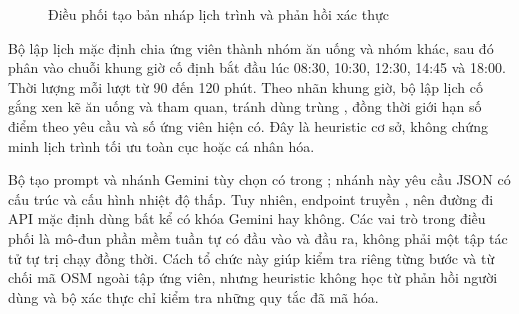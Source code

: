 \begin{figure}[htbp]
    \centering
    \caption{Điều phối tạo bản nháp lịch trình và phản hồi xác thực}
    \label{fig:itinerary_draft_pipeline}
\end{figure}

Bộ lập lịch mặc định chia ứng viên thành nhóm ăn uống và nhóm khác, sau đó phân vào chuỗi khung giờ cố định bắt đầu lúc 08:30, 10:30, 12:30, 14:45 và 18:00. Thời lượng mỗi lượt từ 90 đến 120 phút. Theo nhãn khung giờ, bộ lập lịch cố gắng xen kẽ ăn uống và tham quan, tránh dùng trùng , đồng thời giới hạn số điểm theo yêu cầu và số ứng viên hiện có. Đây là heuristic cơ sở, không chứng minh lịch trình tối ưu toàn cục hoặc cá nhân hóa.

Bộ tạo prompt và nhánh Gemini tùy chọn có trong ; nhánh này yêu cầu JSON có cấu trúc và cấu hình nhiệt độ thấp. Tuy nhiên, endpoint truyền , nên đường đi API mặc định dùng  bất kể có khóa Gemini hay không. Các vai trò trong điều phối là mô-đun phần mềm tuần tự có đầu vào và đầu ra, không phải một tập tác tử tự trị chạy đồng thời. Cách tổ chức này giúp kiểm tra riêng từng bước và từ chối mã OSM ngoài tập ứng viên, nhưng heuristic không học từ phản hồi người dùng và bộ xác thực chỉ kiểm tra những quy tắc đã mã hóa.

